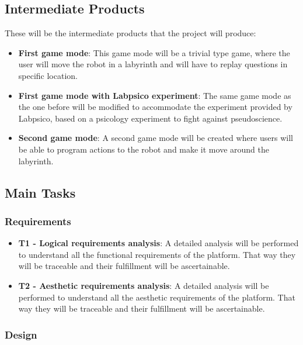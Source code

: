 \subsection{Intermediate Products}

These will be the intermediate products that the project will produce:

\begin{itemize}
\item \textbf{First game mode}: This game mode will be a trivial type game, where the user will move
the robot in a labyrinth and will have to replay questions in specific location.

\item \textbf{First game mode with Labpsico experiment}: The same game mode as the one before will
be modified to accommodate the experiment provided by Labpsico, based on a psicology experiment
to fight against pseudoscience.

\item \textbf{Second game mode}: A second game mode will be created where users will be able to
program actions to the robot and make it move around the labyrinth.
\end{itemize}

\subsection{Main Tasks}

\subsubsection{Requirements}

\begin{itemize}
\item \textbf{T1 - Logical requirements analysis}: A detailed analysis will be performed to
understand all the functional requirements of the platform. That way they will be traceable and
their fulfillment will be ascertainable.

\item \textbf{T2 - Aesthetic requirements analysis}: A detailed analysis will be performed to
understand all the aesthetic requirements of the platform. That way they will be traceable and
their fulfillment will be ascertainable.
\end{itemize}

\subsubsection{Design}

